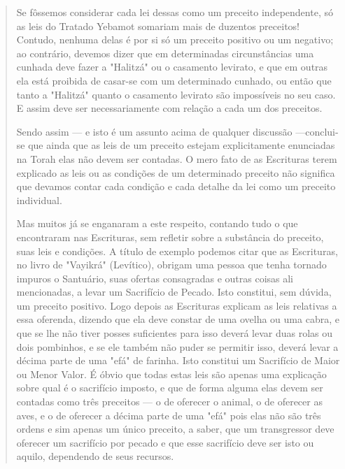 \begin{quote}
Se fôssemos considerar cada lei dessas como um preceito indepen­dente,
só as leis do Tratado Yebamot somariam mais de duzentos preceitos!
Contudo, nenhuma delas é por si só um preceito positivo ou um negativo;
ao contrário, devemos dizer que em determinadas circunstâncias uma
cunhada deve fazer a "Halitzá" ou o casamento levirato, e que em outras
ela está proibida de casar-se com um determinado cunhado, ou então que
tanto a "Halitzá" quan­to o casamento levirato são impossíveis no seu
caso. E assim deve ser necessa­riamente com relação a cada um dos
preceitos.


Sendo assim --- e isto é um assunto acima de qualquer discussão
---conclui-se que ainda que as leis de um preceito estejam
explicitamente enun­ciadas na Torah elas não devem ser contadas. O mero
fato de as Escrituras te­rem explicado as leis ou as condições de um
determinado preceito não signifi­ca que devamos contar cada condição e
cada detalhe da lei como um preceito individual.

Mas muitos já se enganaram a este respeito, contando tudo o que
encontraram nas Escrituras, sem refletir sobre a substância do preceito,
suas leis e condições. A título de exemplo podemos citar que as
Escrituras, no livro de "Vayikrá" (Levítico), obrigam uma pessoa que
tenha tornado impuros o San­tuário, suas ofertas consagradas e outras
coisas ali mencionadas, a levar um Sa­crifício de Pecado. Isto
constitui, sem dúvida, um preceito positivo. Logo de­pois as Escrituras
explicam as leis relativas a essa oferenda, dizendo que ela de­ve
constar de uma ovelha ou uma cabra, e que se lhe não tiver posses
suficien­tes para isso deverá levar duas rolas ou dois pombinhos, e se
ele também não puder se permitir isso, deverá levar a décima parte de
uma "efá" de farinha. Isto constitui um Sacrifício de Maior ou Menor
Valor. É óbvio que todas estas leis são apenas uma explicação sobre qual
é o sacrifício imposto, e que de for­ma alguma elas devem ser contadas
como três preceitos --- o de oferecer o ani­mal, o de oferecer as aves,
e o de oferecer a décima parte de uma "efá" pois elas não são três
ordens e sim apenas um único preceito, a saber, que um transgressor deve
oferecer um sacrifício por pecado e que esse sacrifício deve ser isto ou
aquilo, dependendo de seus recursos.


\end{quote}
